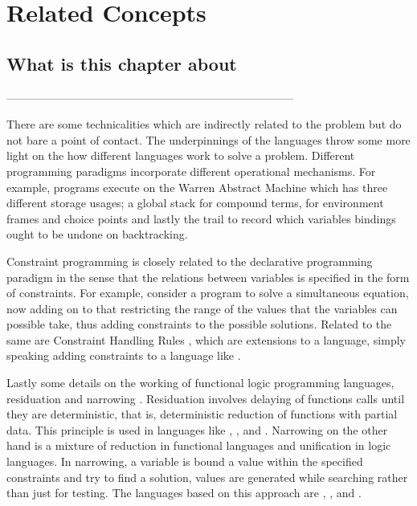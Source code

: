 \documentclass[proposal.tex]{subfiles}
\begin{document}
\chapter{Related Concepts}\label{chap:relatedWork}


\section{What is this chapter about}

-----------------------------------------------------------------------------


There are some technicalities which are indirectly related to the problem but do not bare a point of contact. The underpinnings of the 
languages throw some more light on the how different languages work to solve a problem. Different programming paradigms incorporate 
different operational mechanisms. For example,  programs execute on the Warren Abstract Machine \cite{ait1999warren} which 
has three different storage usages; a global stack for compound terms, for environment frames and choice points and lastly the trail to 
record which variables bindings ought to be undone on backtracking.        

\par Constraint programming \cite{website:constraintprogwiki} is closely related to the declarative programming paradigm in the sense that 
the relations between variables is specified in the form of constraints. For example, consider a program to solve a simultaneous equation, 
now adding on to that restricting the range of the values that the variables can possible take, thus adding constraints to the possible 
solutions. Related to the same are Constraint Handling Rules \cite{website:chrwiki}, which are extensions to a language, simply speaking 
adding constraints to a language like .  

\par Lastly some details on the working of functional logic programming languages, residuation and narrowing 
\cite{hanus1995curry,webiste:wikicurry}. Residuation involves delaying of functions calls until they are deterministic, that is, 
deterministic reduction of functions with partial data. This principle is used in languages like  
\cite{lloyd1999programming:escher},  \cite{website:life},  
\cite{website:nue-prolog} and  \cite{website:oz-mozart}. Narrowing on the other hand is a mixture of reduction in functional 
languages and unification in logic languages. In narrowing, a variable is bound a value within the specified constraints and try to find a 
solution, values are generated while searching rather than just for testing. The languages based on this approach are  
\cite{website:alf},  \cite{website:babel},  \cite{bert1987lpg} and  \cite{website:curry}.   
\end{document}
